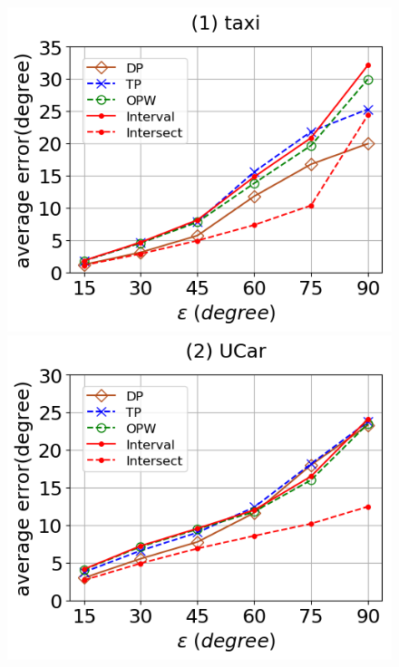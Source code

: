 \begin{figure}[tb!]
	\centering
	\includegraphics[scale=0.315]{Figures/Exp-DAD-error-epsilon-taxi.png} \hspace{1ex}
	\includegraphics[scale=0.315]{Figures/Exp-DAD-error-epsilon-service.png}	\hspace{1ex}

\end{figure}
